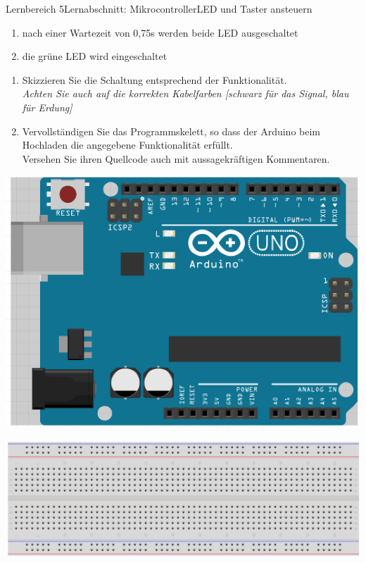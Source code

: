 \documentclass[oneside,openany,headings=optiontotoc,11pt,numbers=noenddot]{scrreprt}
\begin{document}
\begin{worksheet}{Lernbereich 5}{Lernabschnitt: Mikrocontroller}{LED und Taster ansteuern}
\begin{framed}
\begin{enumerate}
\begin{enumerate}[label=\Alph* - ]
					\item nach einer Wartezeit von 0,75s werden beide LED ausgeschaltet
					\item die grüne LED wird eingeschaltet
				\end{enumerate}
			\end{enumerate}
			\par\noindent
			\begin{enumerate}[label=(\alph*)]
				\item Skizzieren Sie die Schaltung entsprechend der Funktionalität.\\
				\textit{Achten Sie auch auf die korrekten Kabelfarben [schwarz für das Signal, blau für Erdung]}
				\item Vervollständigen Sie das Programmskelett, so dass der Arduino beim Hochladen die angegebene Funktionalität erfüllt.\\
				Versehen Sie ihren Quellcode auch mit aussagekräftigen Kommentaren.
			\end{enumerate}
		\end{framed}
		\begin{center}
			\begin{minipage}{0.38\textwidth}
				\includegraphics[width=1.2\textwidth]{../99_Bilder/uno.png}
			\end{minipage}
			\hfill
			\begin{minipage}{0.6\textwidth}
				\begin{center}
					\includegraphics[width=2.2\textwidth,angle=90]{../99_Bilder/breadboard.png}

\end{center}
\end{minipage}
\end{center}
\end{worksheet}
\end{document}
